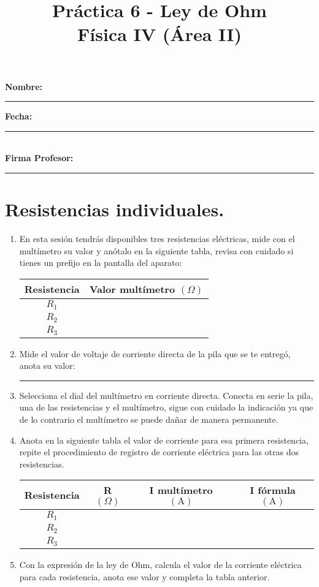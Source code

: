 \documentclass[14pt]{extarticle}
\title{\vspace*{-2cm} Práctica 6 - Ley de Ohm\\  Física IV (Área II) \vspace{-5ex}}
\date{}
\begin{document}
\maketitle

\noindent
\textbf{Nombre:} \rule{8cm}{0.1mm} \textbf{Fecha:} \rule{3cm}{0.1mm} \\[0.5em]
\textbf{Firma Profesor:} \rule{4cm}{0.1mm}

\section{Resistencias individuales.}

\begin{enumerate}
\item En esta sesión tendrás disponibles tres resistencias eléctricas, mide con el multímetro su valor y anótalo en la siguiente tabla, revisa con cuidado si tienes un prefijo en la pantalla del aparato:
\begin{table}[H]
\centering
\begin{tabular}{| c | c |} \hline
Resistencia & Valor multímetro $(\Omega)$ \\ \hline
$R_{1}$ & \\ \hline
$R_{2}$ & \\ \hline
$R_{3}$ & \\ \hline
\end{tabular}
\end{table}
\item Mide el valor de voltaje de corriente directa de la pila que se te entregó, anota su valor: \rule{2cm}{0.1mm}
\item Selecciona el dial del multímetro en corriente directa. Conecta en serie la pila, una de las resistencias y el multímetro, sigue con cuidado la indicación ya que de lo contrario el multímetro se puede dañar de manera permanente.
\item Anota en la siguiente tabla el valor de corriente para esa primera resistencia, repite el procedimiento de registro de corriente eléctrica para las otras dos resistencias.
\begin{table}[H]
\centering
\begin{tabular}{| c | c | c | c |} \hline
Resistencia & R $(\Omega)$ & I multímetro $(\si{\ampere})$ & I fórmula $(\si{\ampere}) $\\ \hline
$R_{1}$ & & & \\ \hline
$R_{2}$ & & & \\ \hline
$R_{3}$ & & & \\ \hline
\end{tabular}
\end{table}
\item Con la expresión de la ley de Ohm, calcula el valor de la corriente eléctrica para cada resistencia, anota ese valor y completa la tabla anterior.
\end{enumerate}
\end{document}
